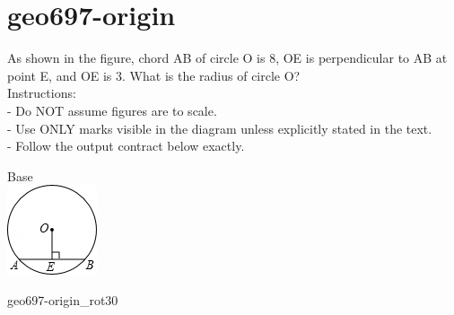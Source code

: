 \documentclass[12pt]{article}
\begin{document}
\section*{geo697-origin}
\noindent\begin{minipage}{\textwidth}
\setlength{\parskip}{4pt}
As shown in the figure, chord AB of circle O is 8, OE is perpendicular to AB at point E, and OE is 3. What is the radius of circle O?\\
Instructions:\\
- Do NOT assume figures are to scale.\\
- Use ONLY marks visible in the diagram unless explicitly stated in the text.\\
- Follow the output contract below exactly.\\
\end{minipage}
\begin{center}
\begin{minipage}{0.32\textwidth}\centering
Base\\
\includegraphics[width=0.95\linewidth]{out_rommath_origin/items/geo697-origin/assets/figure.png}
\end{minipage}
\hfill\begin{minipage}{0.32\textwidth}\centering
geo697-origin\_rot30\\

\end{minipage}
\end{center}
\end{document}
